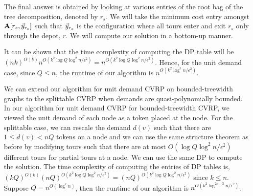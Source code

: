 \documentclass[twoside,leqno]{article}
\newcommand{\eps}{\epsilon}
\begin{document}
The final answer is obtained by looking at various entries of the root bag of the tree decomposition, denoted by $r_s$. We will take the minimum cost entry amongst $\textbf{A}[r_s, \vec{y}_{r_s}]$ such that $\vec{y}_{r_s}$ is the configuration where all tours enter and exit $r_s$ only through the depot, $r$. We will compute our solution in a bottom-up manner.

It can be shown that the time complexity of computing the DP table will be
$(nk)^{O(k)}n^{O(k^2\log Q\log^2 n/\eps^2)} = n^{O(k^2\log Q\log^2 n/\eps^2)}$. Hence, for the unit demand case, since $Q \le n$, the runtime of our algorithm is $n^{O(k^2\log^3 n/\eps^2)}$.

We can extend our algorithm for unit demand CVRP on bounded-treewidth graphs to the splittable CVRP when demands are quasi-polynomially bounded.  In our algorithm for unit demand CVRP for bounded-treewidth CVRP, we viewed the unit demand of each node as a token placed at the node. For the splittable case, we can rescale the demand $d(v)$ such that there are $1 \le d(v) < nQ$ tokens on a node and we can use the same structure theorem as before by modifying tours such that there are at most $O(\log Q \log^2 n/\eps^2)$ different tours for partial tours at a node. We can use the same DP to compute the solution.
The time complexity of computing the entries of DP tables is, $(kQ)^{O(k)}(nQ)^{O(k^2\log Q\log^2 n/\eps^2)} = (nQ)^{O(k^2\log Q\log^2 n/\eps^2)}$ since $k \le n$. Suppose $Q = n^{O(\log^c n)}$, then the runtime of our algorithm is $n^{O(k^2 \log^{2c + 3}n/\eps^2)}$.

\end{document}
